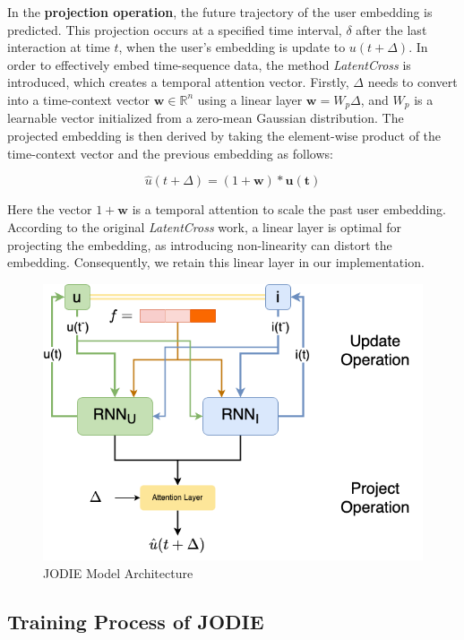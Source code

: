 In the \textbf{projection operation}, the future trajectory of the user embedding is predicted. This projection occurs at a specified time interval, $\delta$ after the last interaction at time $t$, when the user's embedding is update to $u(t+\Delta)$. 
In order to effectively embed time-sequence data, the method \textit{LatentCross}\cite{10.1145/3159652.3159727} is introduced, which creates a temporal attention vector. Firstly, $\Delta$ needs to convert into a time-context vector $\mathbf{w} \in \mathbb{R} ^n$ using a linear layer $\mathbf{w} =W_p \Delta$, and $W_p$ is a learnable vector initialized from a zero-mean Gaussian distribution. The projected embedding is then derived by taking the element-wise product of the time-context vector and the previous embedding as follows:

\[ \hat{u}(t+ \Delta) = (1+\mathbf{w})*\mathbf{u(t)} \]

Here the vector $1+\mathbf{w}$ is a temporal attention to scale the past user embedding. According to the original \textit{LatentCross} work, a linear layer is optimal for projecting the embedding, as introducing non-linearity can distort the embedding. Consequently, we retain this linear layer in our implementation.

\begin{figure}[h]
    \centering
    \includegraphics[width=\linewidth]{figures/04_JODIE.png}
    \caption{JODIE Model Architecture}
    \label{fig:JODIE}
\end{figure}



\subsection{Training Process of JODIE}

